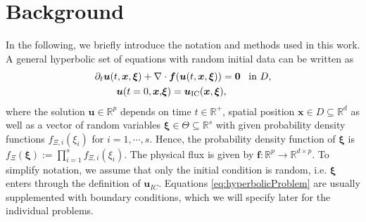 \section{Background}
\label{sec:background}
In the following, we briefly introduce the notation and methods used in this work. A general hyperbolic set of equations with random initial data can be written as
\begin{subequations}\label{eq:hyperbolicProblem}
\begin{align}
\partial_t \bm{u}(t,\bm{x},\bm{\xi}) + \nabla&\cdot\bm{f}(\bm{u}(t,\bm{x},\bm{\xi})) = \bm{0} \enskip \text{ in } D, \\ \label{eq:ic}
\bm{u}(t=0,\bm{x},&\bm{\xi}) = \bm{u}_{\text{IC}}(\bm{x},\bm{\xi}),
\end{align}
\end{subequations}
where the solution $\bm u\in\mathbb{R}^p$ depends on time $t\in\mathbb{R}^+$, spatial position $\bm{x}\in D\subseteq \mathbb{R}^d$ as well as a vector of random variables $\bm{\xi}\in\Theta\subseteq\mathbb{R}^s$ with given probability density functions $f_{\Xi,i}(\xi_i)$ for $i = 1,\cdots,s$. Hence, the probability density function of $\bm{\xi}$ is $f_{\Xi}(\bm\xi):=\prod_{i=1}^s f_{\Xi,i}(\xi_i)$. The physical flux is given by $\bm{f}:\mathbb{R}^p\to\mathbb{R}^{d\times p}$. To simplify notation, we assume that only the initial condition is random, i.e. $\bm{\xi}$ enters through the definition of $\bm{u}_{IC}$. Equations \eqref{eq:hyperbolicProblem} are usually supplemented with boundary conditions, which we will specify later for the individual problems.

